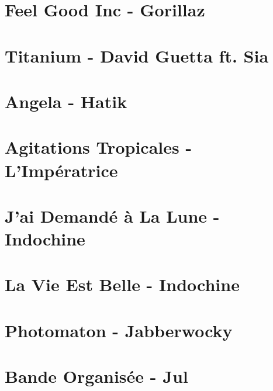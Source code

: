 \documentclass[11pt]{article}
\begin{document}
\section{Feel Good Inc - Gorillaz}


\section{Titanium - David Guetta ft. Sia}
\begin{guitar}

\end{guitar}

\section{Angela - Hatik}
\begin{guitar}

\end{guitar}



\section{Agitations Tropicales - L'Impératrice}




\section{J'ai Demandé à La Lune - Indochine}



\section{La Vie Est Belle - Indochine}
\begin{guitar}

\end{guitar}

\section{Photomaton - Jabberwocky}
\begin{guitar}

\end{guitar}

\section{Bande Organisée - Jul}

\end{document}
